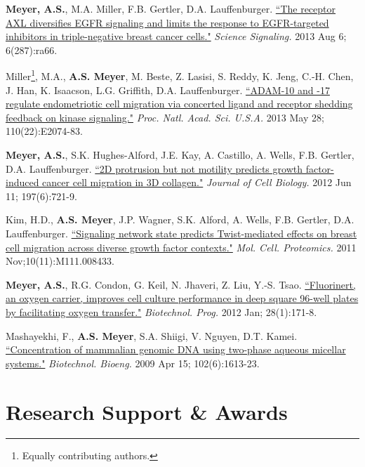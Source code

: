 \documentclass[11pt]{res}
\begin{document}
\begin{resume}
{{\bf Meyer, A.S.}, M.A. Miller, F.B. Gertler, D.A. Lauffenburger. \href{http://www.ncbi.nlm.nih.gov/pubmed/23921085}{``The receptor AXL diversifies EGFR signaling and limits the response to EGFR-targeted inhibitors in triple-negative breast cancer cells."} {\sl Science Signaling.} 2013 Aug 6; 6(287):ra66.

Miller\footnote{Equally contributing authors.}, M.A., {\bf A.S. Meyer}\footnotemark[\value{footnote}], M. Beste, Z. Lasisi, S. Reddy, K. Jeng, C.-H. Chen, J. Han, K. Isaacson, L.G. Griffith, D.A. Lauffenburger. \href{http://www.ncbi.nlm.nih.gov/pubmed/23674691}{``ADAM-10 and -17 regulate endometriotic cell migration via concerted ligand and receptor shedding feedback on kinase signaling."} {\sl Proc. Natl. Acad. Sci. U.S.A.} 2013 May 28; 110(22):E2074-83.

{\bf Meyer, A.S.}, S.K. Hughes-Alford, J.E. Kay, A. Castillo, A. Wells, F.B. Gertler, D.A. Lauffenburger. \href{http://www.ncbi.nlm.nih.gov/pubmed/22665521}{``2D protrusion but not motility predicts growth factor-induced cancer cell migration in 3D collagen."} {\sl Journal of Cell Biology.} 2012 Jun 11; 197(6):721-9.

Kim, H.D., {\bf A.S. Meyer}, J.P. Wagner, S.K. Alford, A. Wells, F.B. Gertler, D.A. Lauffenburger. \href{http://www.ncbi.nlm.nih.gov/pubmed/21832255}{``Signaling network state predicts Twist-mediated effects on breast cell migration across diverse growth factor contexts."} {\sl Mol. Cell. Proteomics.} 2011 Nov;10(11):M111.008433.

{\bf Meyer, A.S.}, R.G. Condon, G. Keil, N. Jhaveri, Z. Liu, Y.-S. Tsao.  \href{http://www.ncbi.nlm.nih.gov/pubmed/21954223}{``Fluorinert, an oxygen carrier, improves cell culture performance in deep square 96-well plates by facilitating oxygen transfer."} {\sl Biotechnol. Prog.} 2012 Jan; 28(1):171-8.

Mashayekhi, F., {\bf A.S. Meyer}, S.A. Shiigi, V. Nguyen, D.T. Kamei. \href{http://www.ncbi.nlm.nih.gov/pubmed/19061237}{``Concentration of mammalian genomic DNA using two-phase aqueous micellar systems."} {\sl Biotechnol. Bioeng.} 2009 Apr 15; 102(6):1613-23.

}


\section{Research Support \& Awards}


\end{resume}
\end{document}
